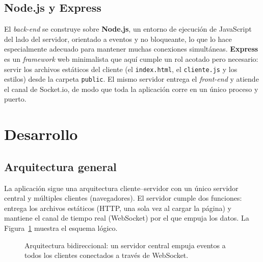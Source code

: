 \documentclass[12pt,a4paper]{article}
\begin{document}
\subsection{Node.js y Express}

El \textit{back-end} se construye sobre \textbf{Node.js}, un entorno de ejecución de JavaScript del lado del servidor, orientado a eventos y no bloqueante, lo que lo hace especialmente adecuado para mantener muchas conexiones simultáneas. \textbf{Express} es un \textit{framework} web minimalista que aquí cumple un rol acotado pero necesario: servir los archivos estáticos del cliente (el \texttt{index.html}, el \texttt{cliente.js} y los estilos) desde la carpeta \texttt{public}. El mismo servidor entrega el \textit{front-end} y atiende el canal de Socket.io, de modo que toda la aplicación corre en un único proceso y puerto.

\section{Desarrollo}

\subsection{Arquitectura general}

La aplicación sigue una arquitectura cliente--servidor con un único servidor central y múltiples clientes (navegadores). El servidor cumple dos funciones: entrega los archivos estáticos (HTTP, una sola vez al cargar la página) y mantiene el canal de tiempo real (WebSocket) por el que empuja los datos. La Figura~\ref{fig:arq} muestra el esquema lógico.

\begin{figure}[H]
\centering
{}
\caption{Arquitectura bidireccional: un servidor central empuja eventos a todos los clientes conectados a través de WebSocket.}
\label{fig:arq}
\end{figure}
\end{document}
